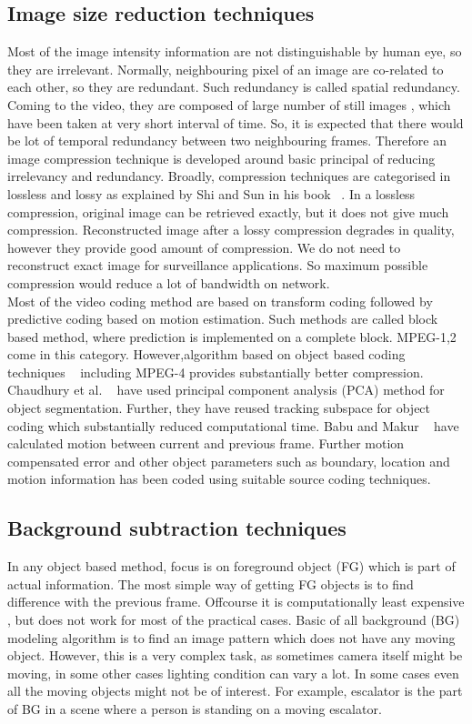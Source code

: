 \subsection{Image size reduction techniques}
\indent Most of the image intensity information are not distinguishable
by human eye, so they are irrelevant. Normally, neighbouring pixel of an
image are co-related to each other, so they are redundant. Such
redundancy is called spatial redundancy. Coming to the video, they are
composed of large number of still images , which have been taken at very
short interval of time. So, it is expected that there would be lot of
temporal redundancy between two neighbouring frames.  Therefore an image
compression technique is developed around basic principal of reducing
irrelevancy and redundancy. Broadly, compression techniques are
categorised in lossless and lossy as explained by Shi and Sun in his
book ~\cite{6}. In a lossless compression, original image can be
retrieved exactly, but it does not give much compression.  Reconstructed
image after a lossy compression degrades in quality, however they
provide good amount of compression. We do not need to reconstruct exact
image for surveillance applications. So maximum possible compression
would reduce a lot of bandwidth on network.\\

\indent Most of the video coding method are based on transform coding
followed by predictive coding based on motion estimation. Such methods
are called block based method, where prediction is implemented on a
complete block.  MPEG-1,2 come in this category. However,algorithm based
on object based coding techniques ~\cite{7, 8} including MPEG-4 provides
substantially better compression. Chaudhury et al. ~\cite{7} have used
principal component analysis (PCA) method for object
segmentation. Further, they have reused tracking subspace for object
coding which substantially reduced computational time. Babu and Makur
~\cite{8} have calculated motion between current and previous frame.
Further motion compensated error and other object parameters such as
boundary, location and motion information has been coded using suitable
source coding techniques. \\

\subsection{Background subtraction techniques}
\indent In any object based method, focus is on foreground object (FG)
which is part of actual information. The most simple way of getting FG
objects is to find difference with the previous frame. Offcourse it is
computationally least expensive , but does not work for most of the
practical cases. Basic of all background (BG) modeling algorithm is to
find an image pattern which does not have any moving object. However,
this is a very complex task, as sometimes camera itself might be moving,
in some other cases lighting condition can vary a lot. In some cases
even all the moving objects might not be of interest. For example,
escalator is the part of BG in a scene where a person is standing on a
moving escalator.\\

